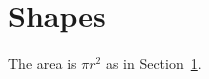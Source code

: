 \documentclass{article}
\newcommand{\area}[1]{\pi #1^2}
\begin{document}
\section{Shapes}\label{sec:shapes}
The area is $\area{r}$ as in Section~\ref{sec:shapes}.

\end{document}
